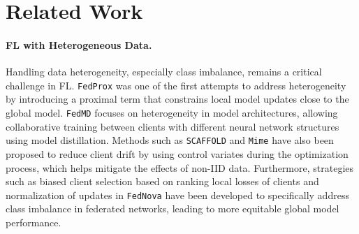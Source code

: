 \section{Related Work}

\paragraph{FL with Heterogeneous Data.} Handling data heterogeneity, especially class imbalance, remains a critical challenge in FL. \texttt{FedProx}\citep{li2020federated} was one of the first attempts to address heterogeneity by introducing a proximal term that constrains local model updates close to the global model. \texttt{FedMD} \citep{li2019fedmd} focuses on heterogeneity in model architectures, allowing collaborative training between clients with different neural network structures using model distillation. Methods such as \texttt{SCAFFOLD} \citep{karimireddy2020scaffold} and \texttt{Mime} \citep{karimireddy2020mime} have also been proposed to reduce client drift by using control variates during the optimization process, which helps mitigate the effects of non-IID data. Furthermore, strategies such as biased client selection \citep{cho2022towards} based on ranking local losses of clients and normalization of updates in \texttt{FedNova} \citep{wang2021novel} have been developed to specifically address class imbalance in federated networks, leading to more equitable global model performance.\vspace{-1.5em}
